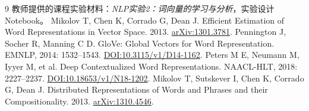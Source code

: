 \documentclass[UTF8,a4paper,zihao=-4,fontset=none]{ctexart}
\begin{document}
\FloatBarrier
\begin{thebibliography}{9}
\small
{} 教师提供的课程实验材料：\emph{NLP实验2：词向量的学习与分析}，实验设计Notebook。
 Mikolov T, Chen K, Corrado G, Dean J. Efficient Estimation of Word Representations in Vector Space. 2013. \href{https://arxiv.org/abs/1301.3781}{arXiv:1301.3781}.
 Pennington J, Socher R, Manning C D. GloVe: Global Vectors for Word Representation. EMNLP, 2014: 1532--1543. \href{https://aclanthology.org/D14-1162/}{DOI:10.3115/v1/D14-1162}.
 Peters M E, Neumann M, Iyyer M, et al. Deep Contextualized Word Representations. NAACL-HLT, 2018: 2227--2237. \href{https://aclanthology.org/N18-1202/}{DOI:10.18653/v1/N18-1202}.
 Mikolov T, Sutskever I, Chen K, Corrado G, Dean J. Distributed Representations of Words and Phrases and their Compositionality. 2013. \href{https://arxiv.org/abs/1310.4546}{arXiv:1310.4546}.
\end{thebibliography}
\end{document}
